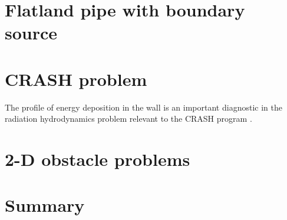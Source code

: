 \section{Flatland pipe with boundary source}

\section{CRASH problem}
The profile of energy deposition in the wall is an important diagnostic in the
radiation hydrodynamics problem relevant to the CRASH program \cite{HolCom2011}.

\section{2-D obstacle problems}
\cite{Mou2006}

\section{Summary}

